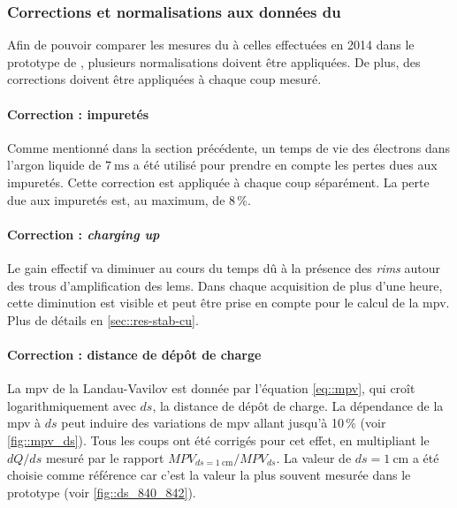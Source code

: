       \subsubsection{Corrections et normalisations aux données du \threeL{}}
        
        Afin de pouvoir comparer les mesures du \TOO{} à celles effectuées en 2014 dans le prototype de \threeL{}, plusieurs normalisations doivent être appliquées. De plus, des corrections doivent être appliquées à chaque coup mesuré.

        \paragraph{Correction : impuretés} Comme mentionné dans la section précédente, un temps de vie des électrons dans l'argon liquide de $\SI{7}{\milli\second}$ a été utilisé pour prendre en compte les pertes dues aux impuretés. Cette correction est appliquée à chaque coup séparément. La perte due aux impuretés est, au maximum, de 8\,\%.

        \paragraph{Correction : \textit{charging up}} Le gain effectif va diminuer au cours du temps dû à la présence des \textit{rims} autour des trous d'amplification des \glspl{lem}. Dans chaque acquisition de plus d'une heure, cette diminution est visible et peut être prise en compte pour le calcul de la \gls{mpv}. Plus de détails en \autoref{sec::res-stab-cu}.

        \paragraph{Correction : distance de dépôt de charge} La \gls{mpv} de la Landau-Vavilov est donnée par l'équation \eqref{eq::mpv}, qui croît logarithmiquement avec $ds$, la distance de dépôt de charge. La dépendance de la \gls{mpv} à $ds$ peut induire des variations de \gls{mpv} allant jusqu'à 10\,\% (voir \autoref{fig::mpv_ds}). Tous les coups ont été corrigés pour cet effet, en multipliant le $dQ/ds$ mesuré par le rapport $MPV_{ds=\SI{1}{\centi\meter}}/MPV_{ds}$. La valeur de $ds=\SI{1}{\centi\meter}$ a été choisie comme référence car c'est la valeur la plus souvent mesurée dans le prototype (voir \autoref{fig::ds_840_842}).

